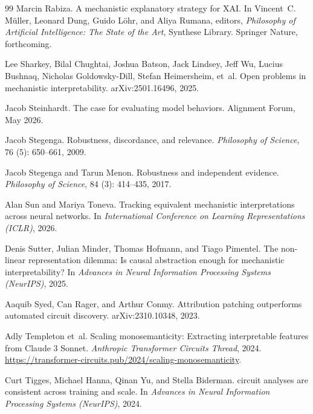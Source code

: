 \documentclass{article}
\begin{document}
\begin{thebibliography}{99}
Marcin Rabiza.
\newblock A mechanistic explanatory strategy for {XAI}.
\newblock In Vincent~C. M\"uller, Leonard Dung, Guido L\"ohr, and Aliya Rumana,
  editors, \emph{Philosophy of Artificial Intelligence: The State of the Art},
  Synthese Library. Springer Nature, forthcoming.

Lee Sharkey, Bilal Chughtai, Joshua Batson, Jack Lindsey, Jeff Wu, Lucius
  Bushnaq, Nicholas Goldowsky-Dill, Stefan Heimersheim, et~al.
\newblock Open problems in mechanistic interpretability.
\newblock arXiv:2501.16496, 2025.

Jacob Steinhardt.
\newblock The case for evaluating model behaviors.
\newblock Alignment Forum, May 2026.

Jacob Stegenga.
\newblock Robustness, discordance, and relevance.
\newblock \emph{Philosophy of Science}, 76 (5): 650--661, 2009.

Jacob Stegenga and Tarun Menon.
\newblock Robustness and independent evidence.
\newblock \emph{Philosophy of Science}, 84 (3): 414--435, 2017.

Alan Sun and Mariya Toneva.
\newblock Tracking equivalent mechanistic interpretations across neural
  networks.
\newblock In \emph{International Conference on Learning Representations
  (ICLR)}, 2026.

Denis Sutter, Julian Minder, Thomas Hofmann, and Tiago Pimentel.
\newblock The non-linear representation dilemma: Is causal abstraction enough
  for mechanistic interpretability?
\newblock In \emph{Advances in Neural Information Processing Systems
  (NeurIPS)}, 2025.

Aaquib Syed, Can Rager, and Arthur Conmy.
\newblock Attribution patching outperforms automated circuit discovery.
\newblock arXiv:2310.10348, 2023.

Adly Templeton et~al.
\newblock Scaling monosemanticity: Extracting interpretable features from
  {Claude 3 Sonnet}.
\newblock \emph{Anthropic Transformer Circuits Thread}, 2024.
\newblock \url{https://transformer-circuits.pub/2024/scaling-monosemanticity}.

Curt Tigges, Michael Hanna, Qinan Yu, and Stella Biderman.
 circuit analyses are consistent across training and scale.
\newblock In \emph{Advances in Neural Information Processing Systems (NeurIPS)}, 2024.


\end{thebibliography}
\end{document}
